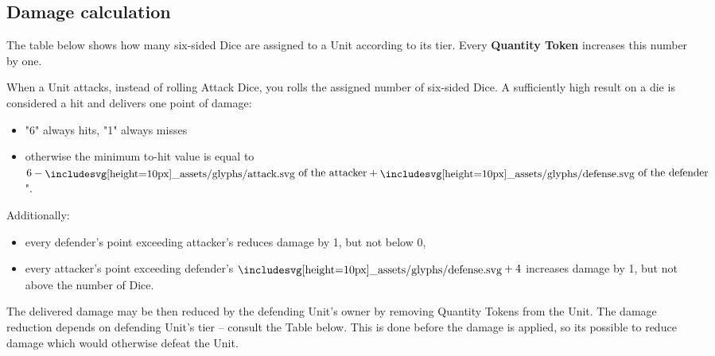 \begin{multicols*}{2}
    \subsection*{Damage calculation}
    
    The table below shows how many six-sided Dice are assigned to a Unit according to its tier. Every \textbf{Quantity Token} increases this number by one.
    
    When a Unit attacks, instead of rolling Attack Dice, you rolls the assigned number of six-sided Dice. A sufficiently high result on a die is considered a hit and delivers one point of damage:
    \begin{itemize}
        \item "6" always hits, "1" always misses
        \item otherwise the minimum to-hit value is equal to $6 - \svg{attack} \text{ of the attacker} + \svg{defense} \text{ of the defender}$".
    \end{itemize}
    Additionally:
    \begin{itemize}
        \item every defender's  point exceeding attacker's  reduces damage by 1, but not below 0,
        \item every attacker's  point exceeding defender's $\svg{defense} + 4$ increases damage by 1, but not above the number of Dice.
    \end{itemize}
    
    The delivered damage may be then reduced by the defending Unit's owner by removing Quantity Tokens from the Unit. The damage reduction depends on defending Unit's tier -- consult the Table below. This is done before the damage is applied, so its possible to reduce damage which would otherwise defeat the Unit.
    
    

\end{multicols*}
